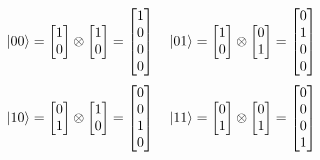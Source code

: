 \[
\ket{00}=
\begin{bmatrix}
1					\\
0
\end{bmatrix} 
\otimes
\begin{bmatrix}
1					\\
0
\end{bmatrix} =
\begin{bmatrix}
1					\\
0					\\
0					\\
0					\\
\end{bmatrix}
\quad
\ket{01}=
\begin{bmatrix}
1					\\
0
\end{bmatrix} 
\otimes
\begin{bmatrix}
0					\\
1
\end{bmatrix} =
\begin{bmatrix}
0					\\
1					\\
0					\\
0					\\
\end{bmatrix}
\]
\[
\ket{10}=
\begin{bmatrix}
0					\\
1
\end{bmatrix} 
\otimes
\begin{bmatrix}
1					\\
0
\end{bmatrix} =
\begin{bmatrix}
0					\\
0					\\
1					\\
0					\\
\end{bmatrix}
\quad
\ket{11}=
\begin{bmatrix}
0					\\
1
\end{bmatrix} 
\otimes
\begin{bmatrix}
0					\\
1
\end{bmatrix} =
\begin{bmatrix}
0					\\
0					\\
0					\\
1					\\
\end{bmatrix}
\]

